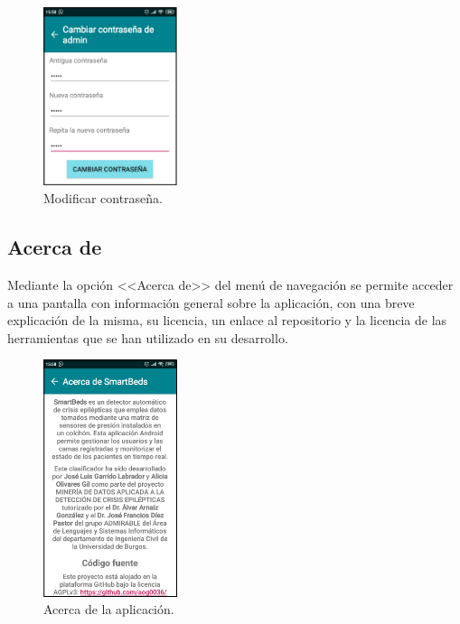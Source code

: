 \begin{figure}[H]
	\centering
	\includegraphics[width=0.35\textwidth]{../img/cambiarcontrasena.png}
	\caption{Modificar contraseña.}
	\label{fig:cambiarcontrasena}
\end{figure} 

\subsection{Acerca de}

Mediante la opción <<Acerca de>> del menú de navegación se permite acceder a una pantalla con información general sobre la aplicación, con una breve explicación de la misma, su licencia, un enlace al repositorio y la licencia de las herramientas que se han utilizado en su desarrollo. 

\begin{figure}[H]
	\centering
	\includegraphics[width=0.35\textwidth]{../img/acercade.png}
	\caption{Acerca de la aplicación.}
	\label{fig:acercade}
\end{figure}


